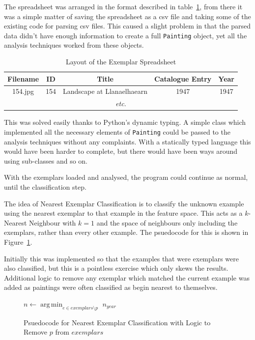 The spreadsheet was arranged in the format described in table~\ref{tab:exemplar-layout}, from
there it was a simple matter of saving the spreadsheet as a \gls{csv} file and taking some of the
existing code for parsing \gls{csv} files. This caused a slight problem in that the parsed data
didn't have enough information to create a full \texttt{Painting} object, yet all the analysis
techniques worked from these objects.

\begin{table}[h]
\centering
\begin{tabular}{|c|c|c|c|c|} \hline
Filename & ID  & Title                      & Catalogue Entry & Year \\\hline
154.jpg  & 154 & Landscape at Llanaelhaearn & 1947            & 1947 \\\hline
\multicolumn{5}{|c|}{\textit{etc.}}\\\hline
\end{tabular}
\caption{Layout of the Exemplar Spreadsheet}\label{tab:exemplar-layout}
\end{table}

This was solved easily thanks to Python's dynamic typing. A simple class which implemented all the
necessary elements of \texttt{Painting} could be passed to the analysis techniques without any
complaints. With a statically typed language this would have been harder to complete, but there
would have been ways around using sub-classes and so on.

With the exemplars loaded and analysed, the program could continue as normal, until the
classification step.

The idea of Nearest Exemplar Classification is to classify the unknown example using the nearest
exemplar to that example in the feature space. This acts as a $k$-Nearest Neighbour with $k=1$ and
the space of neighbours only including the exemplars, rather than every other example. The 
psuedocode for this is shown in Figure~\ref{fig:nec-psuedo}.

Initially this was implemented so that the examples that were exemplars were also classified, but
this is a pointless exercise which only skews the results. Additional logic to remove any exemplar
which matched the current example was added as paintings were often classified as begin nearest to
themselves.

\begin{figure}[h]
\begin{algorithmic}
\State $n \gets \operatorname*{arg\,min}_{e \in exemplars \setminus p}$ 
\State \Return $n_{year}$
\EndFunction
\end{algorithmic}
\caption[Psuedocode for Nearest Exemplar Classification with Added Logic]{Psuedocode for Nearest Exemplar Classification with Logic to Remove $p$ from $exemplars$}\label{fig:nec-psuedo}
\end{figure}

